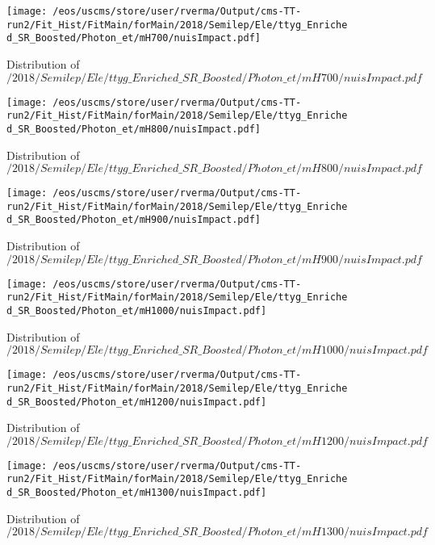 \begin{figure}
\centering
\texttt{[image: /eos/uscms/store/user/rverma/Output/cms-TT-run2/Fit\_Hist/FitMain/forMain/2018/Semilep/Ele/ttyg\_Enriched\_SR\_Boosted/Photon\_et/mH700/nuisImpact.pdf]}
\caption{Distribution of $/2018/Semilep/Ele/ttyg\_Enriched\_SR\_Boosted/Photon\_et/mH700/nuisImpact.pdf$}
\end{figure}

\begin{figure}
\centering
\texttt{[image: /eos/uscms/store/user/rverma/Output/cms-TT-run2/Fit\_Hist/FitMain/forMain/2018/Semilep/Ele/ttyg\_Enriched\_SR\_Boosted/Photon\_et/mH800/nuisImpact.pdf]}
\caption{Distribution of $/2018/Semilep/Ele/ttyg\_Enriched\_SR\_Boosted/Photon\_et/mH800/nuisImpact.pdf$}
\end{figure}

\begin{figure}
\centering
\texttt{[image: /eos/uscms/store/user/rverma/Output/cms-TT-run2/Fit\_Hist/FitMain/forMain/2018/Semilep/Ele/ttyg\_Enriched\_SR\_Boosted/Photon\_et/mH900/nuisImpact.pdf]}
\caption{Distribution of $/2018/Semilep/Ele/ttyg\_Enriched\_SR\_Boosted/Photon\_et/mH900/nuisImpact.pdf$}
\end{figure}

\begin{figure}
\centering
\texttt{[image: /eos/uscms/store/user/rverma/Output/cms-TT-run2/Fit\_Hist/FitMain/forMain/2018/Semilep/Ele/ttyg\_Enriched\_SR\_Boosted/Photon\_et/mH1000/nuisImpact.pdf]}
\caption{Distribution of $/2018/Semilep/Ele/ttyg\_Enriched\_SR\_Boosted/Photon\_et/mH1000/nuisImpact.pdf$}
\end{figure}

\begin{figure}
\centering
\texttt{[image: /eos/uscms/store/user/rverma/Output/cms-TT-run2/Fit\_Hist/FitMain/forMain/2018/Semilep/Ele/ttyg\_Enriched\_SR\_Boosted/Photon\_et/mH1200/nuisImpact.pdf]}
\caption{Distribution of $/2018/Semilep/Ele/ttyg\_Enriched\_SR\_Boosted/Photon\_et/mH1200/nuisImpact.pdf$}
\end{figure}

\begin{figure}
\centering
\texttt{[image: /eos/uscms/store/user/rverma/Output/cms-TT-run2/Fit\_Hist/FitMain/forMain/2018/Semilep/Ele/ttyg\_Enriched\_SR\_Boosted/Photon\_et/mH1300/nuisImpact.pdf]}
\caption{Distribution of $/2018/Semilep/Ele/ttyg\_Enriched\_SR\_Boosted/Photon\_et/mH1300/nuisImpact.pdf$}
\end{figure}


